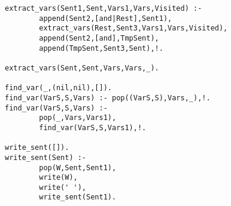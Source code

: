 \begin{verbatim}
extract_vars(Sent1,Sent,Vars1,Vars,Visited) :-
        append(Sent2,[and|Rest],Sent1),
        extract_vars(Rest,Sent3,Vars1,Vars,Visited),
        append(Sent2,[and],TmpSent),
        append(TmpSent,Sent3,Sent),!.

extract_vars(Sent,Sent,Vars,Vars,_).

find_var(_,(nil,nil),[]).
find_var(VarS,S,Vars) :- pop((VarS,S),Vars,_),!.
find_var(VarS,S,Vars) :-
        pop(_,Vars,Vars1),
        find_var(VarS,S,Vars1),!.

write_sent([]).
write_sent(Sent) :- 
        pop(W,Sent,Sent1),
        write(W),
        write(' '),
        write_sent(Sent1).
\end{verbatim}
